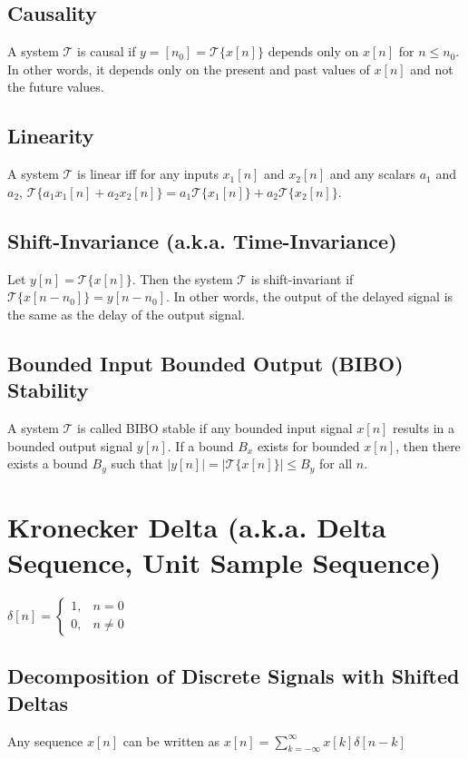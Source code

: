 \documentclass[11pt]{article}
\begin{document}
\subsection{Causality}
A system $\mathcal{T}$ is causal if $y=[n_0]=\mathcal{T}\{x[n]\}$ depends only on $x[n]$ for $n \leq n_0$. In other words, it depends only on the present and past values of $x[n]$ and not the future values.

\subsection{Linearity}
A system $\mathcal{T}$ is linear iff for any inputs $x_1[n]$ and $x_2[n]$ and any scalars $a_1$ and $a_2$, $\mathcal{T}\{a_1x_1[n]+a_2x_2[n]\} = a_1\mathcal{T}\{x_1[n]\}+a_2\mathcal{T}\{x_2[n]\}$. 

\subsection{Shift-Invariance (a.k.a. Time-Invariance)}
Let $y[n] = \mathcal{T}\{x[n]\}$. Then the system $\mathcal{T}$ is shift-invariant if $\mathcal{T}\{x[n-n_0]\} = y[n-n_0]$. In other words, the output of the delayed signal is the same as the delay of the output signal.

\subsection{Bounded Input Bounded Output (BIBO) Stability}
A system $\mathcal{T}$ is called BIBO stable if any bounded input signal $x[n]$ results in a bounded output signal $y[n]$. If a bound $B_x$ exists for bounded $x[n]$, then there exists a bound $B_y$ such that $|y[n]|=|\mathcal{T}\{x[n]\}| \leq B_y$ for all $n$.

\section{Kronecker Delta (a.k.a. Delta Sequence, Unit Sample Sequence)}

$\delta[n] = \begin{cases}1, & n = 0 \\ 0, & n\neq 0 \end{cases}$

\subsection{Decomposition of Discrete Signals with Shifted Deltas}
Any sequence $x[n]$ can be written as $x[n]=\sum\limits_{k=-\infty}^\infty x[k]\delta[n-k]$
\end{document}
